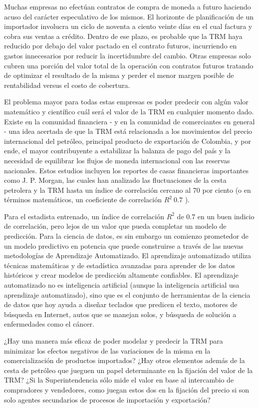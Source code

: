 \documentclass[letterpaper, spanish, 11pt]{report}
\begin{document}
Muchas empresas no efectúan contratos de compra de moneda a futuro haciendo acuso del carácter especulativo de los mismos. El horizonte de planificación de un importador involucra un ciclo de noventa a ciento veinte días en el cual factura y cobra sus ventas a crédito. Dentro de ese plazo, es probable que la TRM haya reducido por debajo del valor pactado en el contrato futuros, incurriendo en gastos innecesarios por reducir la incertidumbre del cambio. Otras empresas solo cubren una porción del valor total de la operación con contratos futuros tratando de optimizar el resultado de la misma y perder el menor margen posible de rentabilidad versus el costo de cobertura.

El problema mayor para todas estas empresas es poder predecir con algún valor matemático y científico cuál será el valor de la TRM en cualquier momento dado. Existe en la comunidad financiera - y en la comunidad de comerciantes en general - una idea acertada de que la TRM está relacionada a los movimientos del precio internacional del petróleo, principal producto de exportación de Colombia, y por ende, el mayor contribuyente a estabilizar la balanza de pago del país y la necesidad de equilibrar los flujos de moneda internacional con las reservas nacionales. Estos estudios incluyen los reportes de casas financieras importantes como J. P. Morgan, las cuales han analizado las fluctuaciones de la cesta petrolera y la TRM hasta un índice de correlación cercano al 70 por ciento (o en términos matemáticos, un coeficiente de correlación \(R^{2} ~ 0.7\) ).

Para el estadista entrenado, un índice de correlación \(R^{2}\) de 0.7 en un buen indicio de correlación, pero lejos de un valor que pueda completar un modelo de predicción. Para la ciencia de datos, es sin embargo un comienzo prometedor de un modelo predictivo en potencia que puede construirse a través de las nuevas metodologías de Aprendizaje Automatizado. El aprendizaje automatizado utiliza técnicas matemáticas y de estadística avanzadas para aprender de los datos históricos y crear modelos de predicción altamente confiables. El aprendizaje automatizado no es inteligencia artificial (aunque la inteligencia artificial usa aprendizaje automatizado), sino que es el conjunto de herramientas de la ciencia de datos que hoy ayuda a diseñar teclados que predicen el texto, motores de búsqueda en Internet, autos que se manejan solos, y búsqueda de solución a enfermedades como el cáncer.

¿Hay una manera más eficaz de poder modelar y predecir la TRM para minimizar los efectos negativos de las variaciones de la misma en la comercialización de productos importados? ¿Hay otros elementos además de la cesta de petróleo que jueguen un papel determinante en la fijación del valor de la TRM? ¿Si la Superintendencia sólo mide el valor en base al intercambio de compradores y vendedores, como juegan estos dos en la fijación del precio si son solo agentes secundarios de procesos de importación y exportación?
\end{document}
